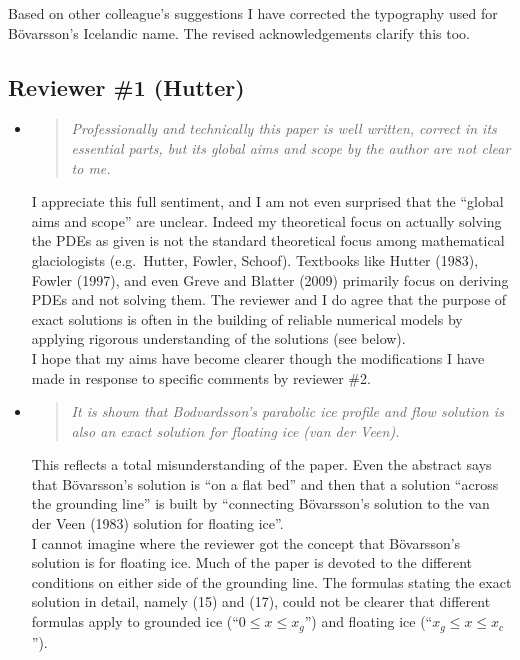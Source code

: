 \documentclass[11pt,reqno]{amsart}
\renewcommand{\dh}{\fontencoding{T1}\selectfont{\symbol{240}}}
\newcommand{\bod}{B\"o\dh varsson\xspace}
\newcommand{\reply}[2]{
\medskip\medskip
\item  \begin{quote}
\emph{#1}
\end{quote}

\medskip
\noindent #2}
\begin{document}
\medskip
\noindent Based on other colleague's suggestions I have corrected the typography used for \bod's Icelandic name.  The revised acknowledgements clarify this too.


\subsection*{Reviewer \#1 (Hutter)}  \begin{itemize}
\reply{Professionally and technically this paper is well written, correct in its essential parts, but its global aims and scope by the author are not clear to me.}
{I appreciate this full sentiment, and I am not even surprised that the ``global aims and scope'' are unclear.  Indeed my theoretical focus on actually solving the PDEs as given is not the standard theoretical focus among mathematical glaciologists (e.g.~Hutter, Fowler, Schoof).  Textbooks like Hutter (1983), Fowler (1997), and even Greve and Blatter (2009) primarily focus on deriving PDEs and not solving them.  The reviewer and I do agree that the purpose of exact solutions is often in the building of reliable numerical models by applying rigorous understanding of the solutions (see below). \medskip \\
I hope that my aims have become clearer though the modifications I have made in response to specific comments by reviewer \#2.}

\reply{It is shown that Bodvardsson's parabolic ice profile and flow solution is also an exact solution for floating ice (van der Veen).}
{This reflects a total misunderstanding of the paper.  Even the abstract says that \bod's solution is ``on a flat bed'' and then that a solution ``across the grounding line'' is built by ``connecting \bod's solution to the van der Veen (1983) solution for floating ice''. \medskip \\
I cannot imagine where the reviewer got the concept that \bod's solution is for floating ice.  Much of the paper is devoted to the different conditions on either side of the grounding line.  The formulas stating the exact solution in detail, namely (15) and (17), could not be clearer that different formulas apply to grounded ice (``$0 \le x \le x_g$'') and floating ice (``$x_g \le x \le x_c$'').}


\end{itemize}
\end{document}
